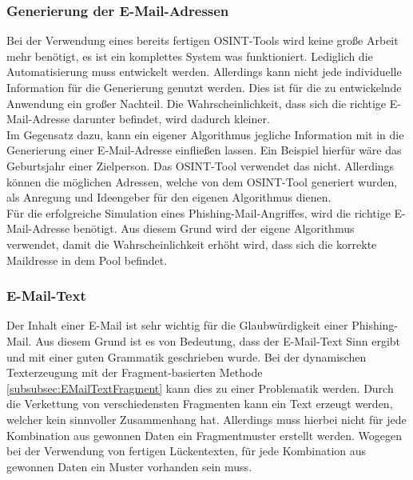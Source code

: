 	\subsubsection{Generierung der E-Mail-Adressen}
	Bei der Verwendung eines bereits fertigen OSINT-Tools wird keine große Arbeit mehr benötigt, es ist ein komplettes System was funktioniert. Lediglich die Automatisierung muss entwickelt werden. Allerdings kann nicht jede individuelle Information für die Generierung genutzt werden. Dies ist für die zu entwickelnde Anwendung ein großer Nachteil. Die Wahrscheinlichkeit, dass sich die richtige E-Mail-Adresse darunter befindet, wird dadurch kleiner.\\
	Im Gegensatz dazu, kann ein eigener Algorithmus jegliche Information mit in die Generierung einer E-Mail-Adresse einfließen lassen. Ein Beispiel hierfür wäre das Geburtsjahr einer Zielperson. Das OSINT-Tool \cite{EmailAssumptions} verwendet das nicht. Allerdings können die möglichen Adressen, welche von dem OSINT-Tool generiert wurden, als Anregung und Ideengeber für den eigenen Algorithmus dienen.\\
	Für die erfolgreiche Simulation eines Phishing-Mail-Angriffes, wird die richtige E-Mail-Adresse benötigt. Aus diesem Grund wird der eigene Algorithmus verwendet, damit die Wahrscheinlichkeit erhöht wird, dass sich die korrekte Maildresse in dem Pool befindet.
	
	\subsubsection{E-Mail-Text}
	Der Inhalt einer E-Mail ist sehr wichtig für die Glaubwürdigkeit einer Phishing-Mail. Aus diesem Grund ist es von Bedeutung, dass der E-Mail-Text Sinn ergibt und mit einer guten Grammatik geschrieben wurde. Bei der dynamischen Texterzeugung mit der Fragment-basierten Methode \ref{subsubsec:EMailTextFragment} kann dies zu einer Problematik werden. Durch die Verkettung von verschiedensten Fragmenten kann ein Text erzeugt werden, welcher kein sinnvoller Zusammenhang hat. Allerdings muss hierbei nicht für jede Kombination aus gewonnen Daten ein Fragmentmuster erstellt werden. Wogegen bei der Verwendung von fertigen Lückentexten, für jede Kombination aus gewonnen Daten ein Muster vorhanden sein muss.

	
